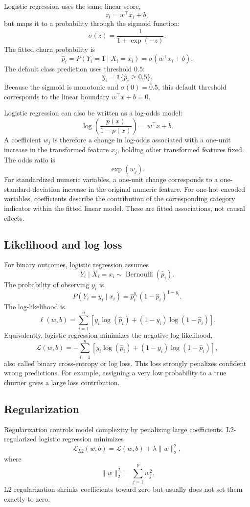 Logistic regression uses the same linear score,
\[
z_i = w^\top x_i + b,
\]
but maps it to a probability through the sigmoid function:
\[
\sigma(z)
=
\frac{1}{1+\exp(-z)}.
\]
The fitted churn probability is
\[
\hat{p}_i
=
P(Y_i=1\mid X_i=x_i)
=
\sigma(w^\top x_i+b).
\]
The default class prediction uses threshold \(0.5\):
\[
\hat{y}_i
=
\mathbb{1}\{\hat{p}_i \geq 0.5\}.
\]
Because the sigmoid is monotonic and \(\sigma(0)=0.5\), this default threshold corresponds to the linear boundary \(w^\top x+b=0\).

Logistic regression can also be written as a log-odds model:
\[
\log\left(\frac{p(x)}{1-p(x)}\right)
=
w^\top x+b.
\]
A coefficient \(w_j\) is therefore a change in log-odds associated with a one-unit increase in the transformed feature \(x_j\), holding other transformed features fixed. The odds ratio is
\[
\exp(w_j).
\]
For standardized numeric variables, a one-unit change corresponds to a one-standard-deviation increase in the original numeric feature. For one-hot encoded variables, coefficients describe the contribution of the corresponding category indicator within the fitted linear model. These are fitted associations, not causal effects.

\subsection{Likelihood and log loss}

For binary outcomes, logistic regression assumes
\[
Y_i \mid X_i=x_i \sim \operatorname{Bernoulli}(\hat{p}_i).
\]
The probability of observing \(y_i\) is
\[
P(Y_i=y_i\mid x_i)
=
\hat{p}_i^{y_i}
(1-\hat{p}_i)^{1-y_i}.
\]
The log-likelihood is
\[
\ell(w,b)
=
\sum_{i=1}^n
\left[
y_i\log(\hat{p}_i)
+
(1-y_i)\log(1-\hat{p}_i)
\right].
\]
Equivalently, logistic regression minimizes the negative log-likelihood,
\[
\mathcal{L}(w,b)
=
-
\sum_{i=1}^n
\left[
y_i\log(\hat{p}_i)
+
(1-y_i)\log(1-\hat{p}_i)
\right],
\]
also called binary cross-entropy or log loss. This loss strongly penalizes confident wrong predictions. For example, assigning a very low probability to a true churner gives a large loss contribution.

\subsection{Regularization}

Regularization controls model complexity by penalizing large coefficients. L2-regularized logistic regression minimizes
\[
\mathcal{L}_{L2}(w,b)
=
\mathcal{L}(w,b) + \lambda \|w\|_2^2,
\]
where
\[
\|w\|_2^2 = \sum_{j=1}^p w_j^2.
\]
L2 regularization shrinks coefficients toward zero but usually does not set them exactly to zero.

